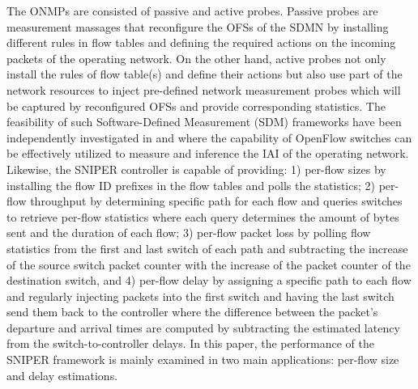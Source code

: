 The ONMPs are consisted of passive and active probes. Passive probes are measurement massages that reconfigure the OFSs of the SDMN by installing different rules in flow tables and defining the required actions on the incoming packets of the operating network. On the other hand, active probes not only install the rules of flow table(s) and define their actions but also use part of the network resources to inject pre-defined network measurement probes which will be captured by reconfigured OFSs and provide corresponding statistics. The feasibility of such Software-Defined Measurement (SDM) frameworks have been independently investigated in \cite{IF14iSTAMP:2014} and \cite{Adrichen:2014} where the capability of OpenFlow switches can be effectively utilized to measure and inference the IAI of the operating network. Likewise, the SNIPER controller is capable of providing: 1) per-flow sizes \cite{IF14iSTAMP:2014} by installing the flow ID prefixes in the flow tables and polls the statistics; 2) per-flow throughput \cite{Adrichen:2014} by determining specific path for each flow and queries switches to retrieve per-flow statistics where each query determines the amount of bytes sent and the duration of each flow; 3) per-flow packet loss \cite{Adrichen:2014} by polling flow statistics from the first and last switch of each path and subtracting the increase of the source switch packet counter with the increase of the packet counter of the destination switch, and 4) per-flow delay \cite{Adrichen:2014} by assigning a specific path to each flow and regularly injecting packets into the first switch and having the last switch send them back to the controller where the difference between the packet's departure and arrival times are computed by subtracting the estimated latency from the switch-to-controller delays. In this paper, the performance of the SNIPER framework is mainly examined in two main applications: per-flow size and delay estimations.

